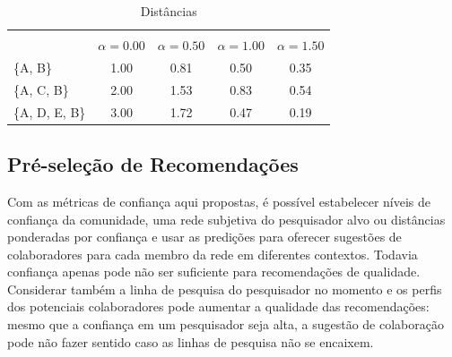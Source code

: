 \documentclass[12pt]{article}
\begin{document}
\begin{center}
  \begin{table}[ht]
    \caption{Distâncias}
    \label{tab:distances}
    \centering
    \begin{tabular}{|lcccc|}
      \hline
      \rowcolor[HTML]{343434} 
      \multicolumn{1}{|c}{\cellcolor[HTML]{343434}{\color[HTML]{FFFFFF} }}                       & \multicolumn{4}{c|}{\cellcolor[HTML]{343434}{\color[HTML]{FFFFFF} $ d^{w\alpha}(i, j) $}}                                               \\
      \rowcolor[HTML]{656565} 
      \multicolumn{1}{|c}{\multirow{-2}{*}{\cellcolor[HTML]{343434}{\color[HTML]{FFFFFF} Caminho}}} & {\color[HTML]{EFEFEF} $ \alpha = 0.00 $} & {\color[HTML]{EFEFEF} $ \alpha=0.50 $} & {\color[HTML]{EFEFEF} $ \alpha=1.00 $} & {\color[HTML]{EFEFEF} $ \alpha=1.50 $} \\ \cline{1-1}
      \multicolumn{1}{|l|}{\{A, B\}}                                                             & 1.00                        & 0.81                        & 0.50                        & 0.35                        \\
      \multicolumn{1}{|l|}{\{A, C, B\}}                                                          & 2.00                        & 1.53                        & 0.83                        & 0.54                        \\
      \multicolumn{1}{|l|}{\{A, D, E, B\}}                                                       & 3.00                        & 1.72                        & 0.47                        & 0.19                        \\ \hline
    \end{tabular}
  \end{table}  
\end{center}

\subsection{Pré-seleção de Recomendações} \label{sect:pre-selection}

Com as métricas de confiança aqui propostas, é possível estabelecer níveis de confiança da comunidade, uma rede subjetiva do 
pesquisador alvo ou distâncias ponderadas por confiança e usar as predições para oferecer sugestões de colaboradores para cada 
membro da rede em diferentes contextos. Todavia confiança apenas pode não ser suficiente para recomendações de qualidade. 
Considerar também a linha de pesquisa do pesquisador no momento e os perfis dos potenciais colaboradores pode aumentar a qualidade 
das recomendações: mesmo que a confiança em um pesquisador seja alta, a sugestão de colaboração pode não fazer sentido caso as 
linhas de pesquisa não se encaixem.
\end{document}
